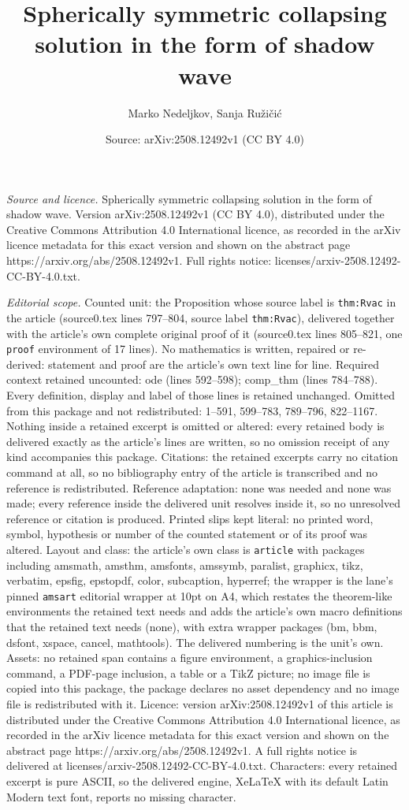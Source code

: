 \documentclass[10pt,a4paper]{amsart}
\title[Spherically symmetric collapsing solution in the form of sha]{Spherically symmetric collapsing solution in the form of shadow wave}
\author{Marko Nedeljkov, Sanja Ru\v{z}i\v{c}i\'c}
\date{Source: arXiv:2508.12492v1 (CC BY 4.0)}
\begin{document}
\maketitle

\noindent\emph{Source and licence.} Spherically symmetric collapsing solution in the form of shadow wave. Version arXiv:2508.12492v1 (CC BY 4.0), distributed under the Creative Commons Attribution 4.0 International licence, as recorded in the arXiv licence metadata for this exact version and shown on the abstract page https://arxiv.org/abs/2508.12492v1. Full rights notice: licenses/arxiv-2508.12492-CC-BY-4.0.txt.\par\smallskip

\noindent\textit{Editorial scope.} Counted unit: the Proposition whose source label is \texttt{thm:Rvac} in the article (source0.tex lines 797--804, source label \texttt{thm:Rvac}), delivered together with the article's own complete original proof of it (source0.tex lines 805--821, one \texttt{proof} environment of 17 lines). No mathematics is written, repaired or re-derived: statement and proof are the article's own text line for line. Required context retained uncounted: ode (lines 592--598); comp\_thm (lines 784--788). Every definition, display and label of those lines is retained unchanged. Omitted from this package and not redistributed: 1--591, 599--783, 789--796, 822--1167. Nothing inside a retained excerpt is omitted or altered: every retained body is delivered exactly as the article's lines are written, so no omission receipt of any kind accompanies this package. Citations: the retained excerpts carry no citation command at all, so no bibliography entry of the article is transcribed and no reference is redistributed. Reference adaptation: none was needed and none was made; every reference inside the delivered unit resolves inside it, so no unresolved reference or citation is produced. Printed slips kept literal: no printed word, symbol, hypothesis or number of the counted statement or of its proof was altered. Layout and class: the article's own class is \texttt{article} with packages including amsmath, amsthm, amsfonts, amssymb, paralist, graphicx, tikz, verbatim, epsfig, epstopdf, color, subcaption, hyperref; the wrapper is the lane's pinned \texttt{amsart} editorial wrapper at 10pt on A4, which restates the theorem-like environments the retained text needs and adds the article's own macro definitions that the retained text needs (none), with extra wrapper packages (bm, bbm, dsfont, xspace, cancel, mathtools). The delivered numbering is the unit's own. Assets: no retained span contains a figure environment, a graphics-inclusion command, a PDF-page inclusion, a table or a TikZ picture; no image file is copied into this package, the package declares no asset dependency and no image file is redistributed with it. Licence: version arXiv:2508.12492v1 of this article is distributed under the Creative Commons Attribution 4.0 International licence, as recorded in the arXiv licence metadata for this exact version and shown on the abstract page https://arxiv.org/abs/2508.12492v1. A full rights notice is delivered at licenses/arxiv-2508.12492-CC-BY-4.0.txt. Characters: every retained excerpt is pure ASCII, so the delivered engine, XeLaTeX with its default Latin Modern text font, reports no missing character.
\end{document}
